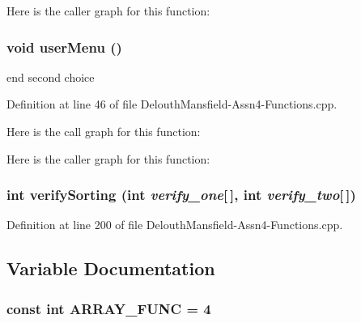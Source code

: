 Here is the caller graph for this function:

\hypertarget{_delouth_mansfield-_assn4-_functions_8cpp_adcd155b8f245b1bf80a9863a6301f4ff}{
\subsubsection[{userMenu}]{\setlength{\rightskip}{0pt plus 5cm}void userMenu ()}}
\label{_delouth_mansfield-_assn4-_functions_8cpp_adcd155b8f245b1bf80a9863a6301f4ff}


end second choice 



Definition at line 46 of file DelouthMansfield-\/Assn4-\/Functions.cpp.



Here is the call graph for this function:



Here is the caller graph for this function:

\hypertarget{_delouth_mansfield-_assn4-_functions_8cpp_ac769e49e955e35b43bc75d4201200e25}{
\subsubsection[{verifySorting}]{\setlength{\rightskip}{0pt plus 5cm}int verifySorting (int {\em verify\_\-one}\mbox{[}$\,$\mbox{]}, \/  int {\em verify\_\-two}\mbox{[}$\,$\mbox{]})}}
\label{_delouth_mansfield-_assn4-_functions_8cpp_ac769e49e955e35b43bc75d4201200e25}


Definition at line 200 of file DelouthMansfield-\/Assn4-\/Functions.cpp.



\subsection{Variable Documentation}
\hypertarget{_delouth_mansfield-_assn4-_functions_8cpp_a3b95dd60d5c45f7cc3733769f3d54868}{
\subsubsection[{ARRAY\_\-FUNC}]{\setlength{\rightskip}{0pt plus 5cm}const int {\bf ARRAY\_\-FUNC} = 4}}
\label{_delouth_mansfield-_assn4-_functions_8cpp_a3b95dd60d5c45f7cc3733769f3d54868}


